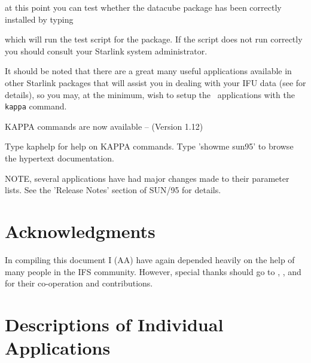 \documentclass[twoside,11pt,nolof]{starlink}
\providecommand{\KAPPA}{{\footnotesize KAPPA}\normalsize}
\providecommand{\KAPPAref}{\xref{\KAPPA}{sun95}{}}
\begin{document}
at this point you can test whether the datacube package has been
correctly installed by typing

\begin{small}
\begin{terminalv}
\end{terminalv}
\end{small}

which will run the test script for the package. If the script does not
run correctly you should consult your Starlink system administrator.

It should be noted that there are a great many useful applications
available in other Starlink packages that will assist you in dealing
with your IFU data (see  for details), so you may,
at the minimum, wish to setup the \KAPPAref\ applications with the
\texttt{kappa} command.

\begin{small}
\begin{terminalv}

    KAPPA commands are now available -- (Version 1.12)

    Type kaphelp for help on KAPPA commands.
    Type 'showme sun95' to browse the hypertext documentation.

    NOTE, several applications have had major changes made to their
    parameter lists. See the 'Release Notes' section of SUN/95 for
    details.
%
\end{terminalv}
\end{small}

\section*{Acknowledgments\label{sun237_acks}}

In compiling this document I (AA) have again depended heavily on the help
of many people in the IFS community. However, special thanks should go
to , ,
 and
 for their
co-operation and contributions.

\newpage
\appendix
\section{Descriptions of Individual Applications}
\label{sun237_appendix_descriptions}
\end{document}
